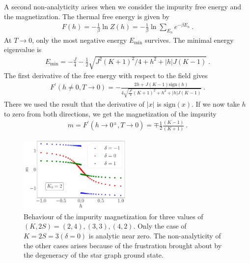 \documentclass[reprint,prb,superscriptaddress]{revtex4-2}
\begin{document}
A second non-analyticity arises when we consider the impurity free energy and the magnetization. The thermal free energy is given by
\begin{equation}\begin{aligned}
	F(h) = -\frac{1}{\beta}\ln Z(h) = -\frac{1}{\beta}\ln\sum_{E_n}e^{-\beta E_n}~.
\end{aligned}\end{equation}
At \(T \to 0\), only the most negative energy \(E_\text{min}\) survives. The minimal energy eigenvalue is
\begin{equation}\begin{aligned}
	E_\text{min} = - \frac{J}{4} - \frac{1}{2}\sqrt{J^2(K+1)^2/4 + h^2 + |h|J(K-1)}~.
\end{aligned}\end{equation}
The first derivative of the free energy with respect to the field gives
\begin{equation}\begin{aligned}
	F^\prime(h\neq 0, T\to 0) =- \frac{2h + J(K-1)\text{sign}(h)}{4\sqrt{\frac{J^2}{4}(K+1)^2 + h^2 + |h|J(K-1)}}~.
\end{aligned}\end{equation}
There we used the result that the derivative of \(|x|\) is \(\text{sign}(x)\). If we now take \(h\) to zero from both directions, we get the magnetization of the impurity
\begin{equation}\begin{aligned}
	m = F^\prime(h \to 0^\pm, T\to 0) = \mp \frac{1}{2}\frac{(K-1)}{(K+1)}~.
\end{aligned}\end{equation}
\begin{figure}[!htpb]
	\centering
	\includegraphics[width=0.49\textwidth]{discmagimpgen.pdf}
	\caption{Behaviour of the impurity magnetization for three values of \(\left(K, 2S\right) = \left(2, 4\right), \left( 3,3 \right), \left(4, 2\right)  \). Only the case of \(K=2S=3 \left(\delta=0\right)\) is analytic near zero. The non-analyticity of the other cases arises because of the frustration brought about by the degeneracy of the star graph ground state.}
	\label{mag_crit}
\end{figure}
\end{document}
